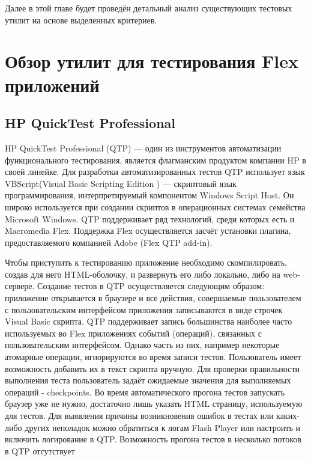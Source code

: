 Далее в этой главе будет проведён детальный анализ существующих тестовых 
утилит на основе выделенных критериев. 

\section*{Обзор утилит для тестирования Flex приложений}

\subsection*{HP QuickTest Professional}

HP QuickTest Professional (QTP) — один из инструментов автоматизации 
функционального тестирования, является флагманским продуктом компании 
HP в своей линейке. Для разработки автоматизированных тестов QTP 
использует язык VBScript(Visual Basic Scripting Edition ) — скриптовый 
язык программирования, интерпретируемый компонентом Windows Script Host.
 Он широко используется при создании скриптов в операционных системах 
 семейства Microsoft Windows. QTP поддерживает ряд технологий, среди 
 которых есть и Macromedia Flex. Поддержка Flex осуществляется засчёт 
 установки плагина, предоставляемого компанией Adobe (Flex QTP add-in).

Чтобы приступить к тестированию приложение необходимо скомпилировать, 
создав для него HTML-оболочку, и развернуть его либо локально, либо на 
web-сервере. Создание тестов  в QTP осуществляется следующим образом: 
приложение открывается в браузере и все действия, совершаемые пользователем с 
пользовательским интерфейсом приложения записываются в виде строчек Visual Basic скрипта. 
QTP поддерживает запись большинства наиболее часто используемых во Flex 
приложениях событий (операций), связанных с пользовательским интерфейсом. 
Однако часть из них, например некоторые атомарные операции, игнорируются 
во время записи тестов. Пользователь имеет возможность добавить их в 
текст скрипта вручную. Для проверки правильности выполнения теста 
пользователь задаёт ожидаемые значения для выполняемых операций - 
checkpoints. Во время автоматического прогона тестов запускать браузер 
уже не нужно, достаточно лишь указать HTML страницу, используемую для 
тестов. Для выявления причины возникновения ошибок в тестах или каких-либо 
других неполадок можно обратиться к логам Flash Player или настроить и 
включить логирование в QTP. Возможность прогона тестов в несколько потоков
в QTP отсутствует

